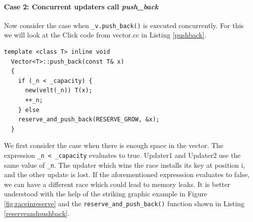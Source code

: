 \documentclass[a4paper,marginparwidth=50pt,marginparsep=10pt]{article}
\begin{document}
\paragraph{Case 2: Concurrent updaters call \emph{push\_back} }
Now consider the case when \verb+_v.push_back()+ is executed concurrently. For this we will look at the Click code from vector.cc in Listing \ref{pushback}.
\begin{lstlisting}[caption = The push\_back() function, label=pushback]
  template <class T> inline void
  Vector<T>::push_back(const T& x)
  {
    if (_n < _capacity) {
      new(velt(_n)) T(x);
      ++_n;
    } else
    reserve_and_push_back(RESERVE_GROW, &x);
  }
\end{lstlisting}
We first consider the case when there is enough space in the vector. The expression \verb$_n < _capacity$ evaluates to true. Updater1 and Updater2 use the same value of \verb+_n+. The updater which wins the race installs its key at position i, and the other update is lost. If the aforementioned expresssion evaluates to false, we can have a different race which could lead to memory leaks. It is better understood with the help of the striking graphic example in Figure \ref{fig:raceinreserve} and the \verb+reserve_and_push_back()+ function shown in Listing \ref{reserveandpushback}.
\end{document}
